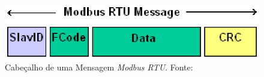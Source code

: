     \begin{figure}[!htpb]
        \centering
        \includegraphics[keepaspectratio=true,scale=0.8]{figuras/modbusrtuheader.eps}
        \caption{Cabeçalho de uma Mensagem \textit{Modbus RTU}. Fonte: \cite{modbus_online}}
        \label{modbusrtuheader}
    \end{figure}

